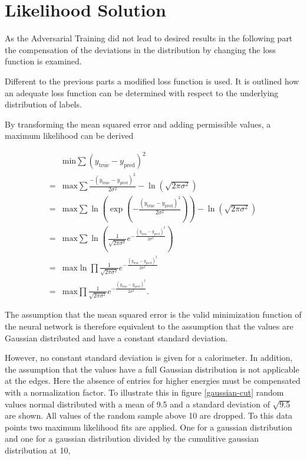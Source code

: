 \documentclass[12pt, a4paper]{thesis}
\begin{document}
\clearpage
\section{Likelihood Solution}
\label{sec:org05c2ceb}

As the Adversarial Training did not lead to desired results in the
following part the compensation of the deviations in the distribution
by changing the loss function is examined.

Different to the previous parts a modified loss function is used. It
is outlined how an adequate loss function can be determined with
respect to the underlying distribution of labels.

By transforming the mean squared error and adding permissible values,
a maximum likelihood can be derived

\begin{align}
    &\text{min} \sum (y_{\text{true}}-y_{\text{pred}})^2
  \\ =&\text{max} \sum\frac{-(y_{\text{true}}-y_{\text{pred}})^2}{2
    \sigma^2} - \ln(\sqrt{2\pi \sigma^2}) \\ = &\text{max} \sum
  \ln(\exp(-\frac{(y_{\text{true}}-y_{\text{pred}})^2}{2 \sigma^2})) -
  \ln(\sqrt{2\pi \sigma^2}) \\ = &\text{max} \sum \ln(
  \frac{1}{\sqrt{2\pi \sigma^2}}
  e^{-\frac{(y_{\text{true}}-y_{\text{pred}})^2}{2 \sigma^2}}) \\ =
  &\text{max} \ln \prod \frac{1}{\sqrt{2\pi \sigma^2}}
  e^{-\frac{(y_{\text{true}}-y_{\text{pred}})^2}{2 \sigma^2}}\\ =
  &\text{max} \prod \frac{1}{\sqrt{2\pi \sigma^2}}
  e^{-\frac{(y_{\text{true}}-y_{\text{pred}})^2}{2 \sigma^2}}.
\end{align}

The assumption that the mean squared error is the valid minimization
function of the neural network is therefore equivalent to the
assumption that the values are Gaussian distributed and have a
constant standard deviation.

However, no constant standard deviation is given for a calorimeter. In
addition, the assumption that the values have a full Gaussian
distribution is not applicable at the edges. Here the absence of
entries for higher energies must be compensated with a normalization
factor. To illustrate this in figure \ref{gaussian-cut} random values
normal distributed with a mean of 9.5 and a standard deviation of
$\sqrt{9.5}$ are shown. All values of the random sample above 10 are
dropped. To this data points two maximum likelihood fits are
applied. One for a gaussian distribution and one for a gaussian
distribution divided by the cumulitive gaussian distribution at 10,
\end{document}
